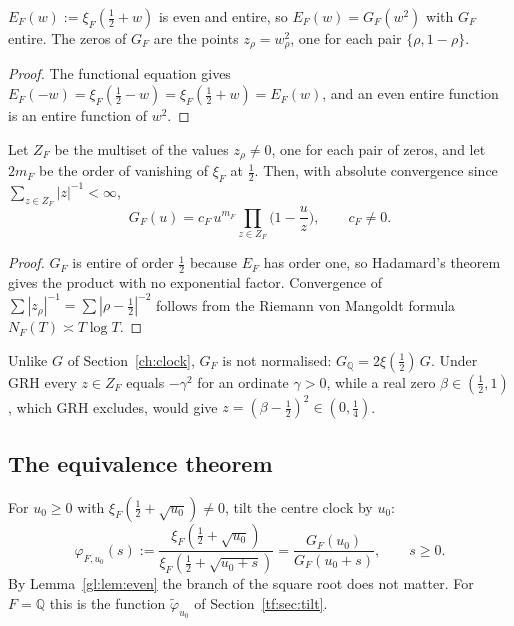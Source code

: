 \begin{lemma}[Evenness]\label{gl:lem:even}
$E_F(w):=\xi_F(\tfrac12+w)$ is even and entire, so $E_F(w)=G_F(w^2)$ with $G_F$ entire. The zeros of $G_F$ are the points $z_\rho=w_\rho^2$, one for each pair $\{\rho,1-\rho\}$.
\end{lemma}

\begin{proof}
The functional equation gives $E_F(-w)=\xi_F(\tfrac12-w)=\xi_F(\tfrac12+w)=E_F(w)$, and an even entire function is an entire function of $w^2$.
\end{proof}

\begin{lemma}\label{gl:lem:product}
Let $Z_F$ be the multiset of the values $z_\rho\neq0$, one for each pair of zeros, and let $2m_F$ be the order of vanishing of $\xi_F$ at $\tfrac12$. Then, with absolute convergence since $\sum_{z\in Z_F}|z|^{-1}<\infty$,
\begin{equation}\label{gl:eq:product}
G_F(u)=c_F\,u^{m_F}\prod_{z\in Z_F}\Big(1-\frac uz\Big),\qquad c_F\neq0.
\end{equation}
\end{lemma}

\begin{proof}
$G_F$ is entire of order $\tfrac12$ because $E_F$ has order one, so Hadamard's theorem gives the product with no exponential factor. Convergence of $\sum|z_\rho|^{-1}=\sum|\rho-\tfrac12|^{-2}$ follows from the Riemann von Mangoldt formula $N_F(T)\asymp T\log T$.
\end{proof}

Unlike $G$ of Section~\ref{ch:clock}, $G_F$ is not normalised: $G_{\mathbb Q}=2\xi(\tfrac12)\,G$. Under GRH every $z\in Z_F$ equals $-\gamma^2$ for an ordinate $\gamma>0$, while a real zero $\beta\in(\tfrac12,1)$, which GRH excludes, would give $z=(\beta-\tfrac12)^2\in(0,\tfrac14)$.

\subsection{The equivalence theorem}

For $u_0\ge0$ with $\xi_F(\tfrac12+\sqrt{u_0})\neq0$, tilt the centre clock by $u_0$:
\begin{equation}\label{gl:eq:Phi}
\varphi_{F,u_0}(s):=\frac{\xi_F(\tfrac12+\sqrt{u_0})}{\xi_F(\tfrac12+\sqrt{u_0+s})}=\frac{G_F(u_0)}{G_F(u_0+s)},\qquad s\ge0.
\end{equation}
By Lemma~\ref{gl:lem:even} the branch of the square root does not matter. For $F=\mathbb Q$ this is the function $\widetilde\varphi_{u_0}$ of Section~\ref{tf:sec:tilt}.

